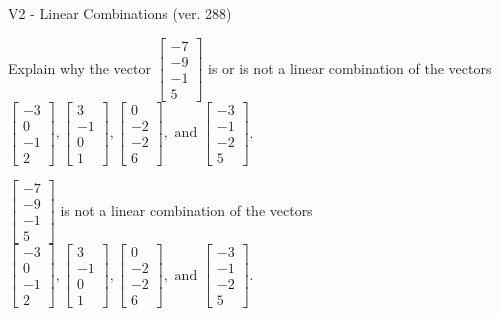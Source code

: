 \begin{exercise}
  \begin{exerciseTitle}V2 - Linear Combinations (ver. 288)\end{exerciseTitle}
  \begin{exerciseStatement}
    Explain why the vector \(\left[\begin{array}{c}
-7 \\
-9 \\
-1 \\
5
\end{array}\right]\)  is or is not a linear 
	combination of the vectors \(\left[\begin{array}{c}
-3 \\
0 \\
-1 \\
2
\end{array}\right] , \left[\begin{array}{c}
3 \\
-1 \\
0 \\
1
\end{array}\right] , \left[\begin{array}{c}
0 \\
-2 \\
-2 \\
6
\end{array}\right] , \text{ and } \left[\begin{array}{c}
-3 \\
-1 \\
-2 \\
5
\end{array}\right]\).
	


  \end{exerciseStatement}
  \begin{exerciseAnswer}
   \(\left[\begin{array}{c}
-7 \\
-9 \\
-1 \\
5
\end{array}\right]\) 
  	 is not  
	a linear combination of the vectors \(\left[\begin{array}{c}
-3 \\
0 \\
-1 \\
2
\end{array}\right] , \left[\begin{array}{c}
3 \\
-1 \\
0 \\
1
\end{array}\right] , \left[\begin{array}{c}
0 \\
-2 \\
-2 \\
6
\end{array}\right] , \text{ and } \left[\begin{array}{c}
-3 \\
-1 \\
-2 \\
5
\end{array}\right]\).


\end{exerciseAnswer}
\end{exercise}

